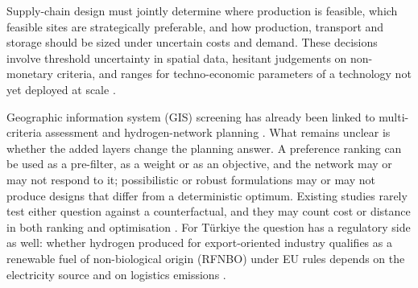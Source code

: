 \documentclass[preprint,12pt,authoryear]{elsarticle}
\begin{document}
Supply-chain design must jointly determine where production is feasible, which feasible sites are strategically preferable, and how production, transport and storage should be sized under uncertain costs and demand. These decisions involve threshold uncertainty in spatial data, hesitant judgements on non-monetary criteria, and ranges for techno-economic parameters of a technology not yet deployed at scale \citep{muller2023green,gundogdu2019spherical,pishvaee2012robust}.

Geographic information system (GIS) screening has already been linked to multi-criteria assessment and hydrogen-network planning \citep{ma2025modeling,zhou2026collaborative,gezen2026spatial}. What remains unclear is whether the added layers change the planning answer. A preference ranking can be used as a pre-filter, as a weight or as an objective, and the network may or may not respond to it; possibilistic or robust formulations may or may not produce designs that differ from a deterministic optimum. Existing studies rarely test either question against a counterfactual, and they may count cost or distance in both ranking and optimisation \citep{zun2026review}. For Türkiye the question has a regulatory side as well: whether hydrogen produced for export-oriented industry qualifies as a renewable fuel of non-biological origin (RFNBO) under EU rules depends on the electricity source and on logistics emissions \citep{eu2023da1184,eu2023da1185}.
\end{document}
